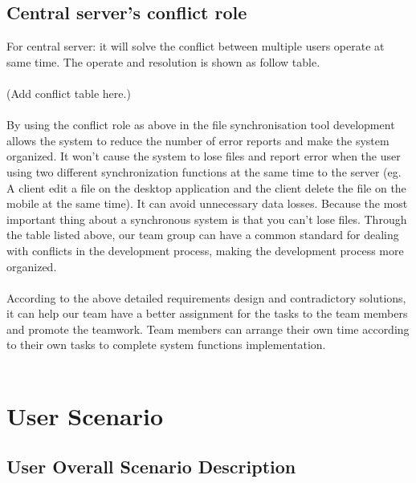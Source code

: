 \subsection{Central server’s conflict role}
For central server: it will solve the conflict between multiple users operate at same time. The operate and resolution is shown as follow table.\\\\
(Add conflict table here.)\\\\
By using the conflict role as above in the file synchronisation tool development allows the system to reduce the number of error reports and make the system organized. It won't cause the system to lose files and report error when the user using two different synchronization functions at the same time to the server (eg. A client edit a file on the desktop application and the client delete the file on the mobile at the same time). It can avoid unnecessary data losses. Because the most important thing about a synchronous system is that you can't lose files. Through the table listed above, our team group can have a common standard for dealing with conflicts in the development process, making the development process more organized.\\\\
According to the above detailed requirements design and contradictory solutions, it can help our team have a better assignment for the tasks to the team members and promote the teamwork. Team members can arrange their own time according to their own tasks to complete system functions implementation.\\\\

\section{User Scenario}
\subsection{User Overall Scenario Description}

